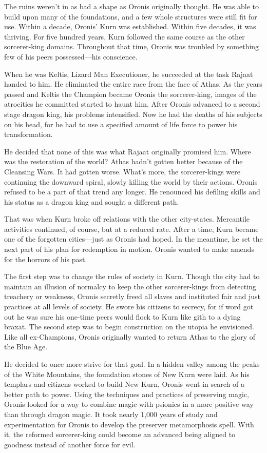 {	The ruins weren't in as bad a shape as Oronis originally thought. He was able to build upon many of the foundations, and a few whole structures were still fit for use. Within a decade, Oronis' Kurn was established. Within five decades, it was thriving. For five hundred years, Kurn followed the same course as the other sorcerer-king domains. Throughout that time, Oronis was troubled by something few of his peers possessed---his conscience.

	When he was Keltis, Lizard Man Executioner, he succeeded at the task Rajaat handed to him. He eliminated the entire race from the face of Athas. As the years passed and Keltis the Champion became Oronis the sorcerer-king, images of the atrocities he committed started to haunt him. After Oronis advanced to a second stage dragon king, his problems intensified. Now he had the deaths of his subjects on his head, for he had to use a specified amount of life force to power his transformation.

	He decided that none of this was what Rajaat originally promised him. Where was the restoration of the world? Athas hadn't gotten better because of the Cleansing Wars. It had gotten worse. What's more, the sorcerer-kings were continuing the downward spiral, slowly killing the world by their actions. Oronis refused to be a part of that trend any longer. He renounced his defiling skills and his status as a dragon king and sought a different path.

	That was when Kurn broke off relations with the other city-states. Mercantile activities continued, of course, but at a reduced rate. After a time, Kurn became one of the forgotten cities---just as Oronis had hoped. In the meantime, he set the next part of his plan for redemption in motion. Oronis wanted to make amends for the horrors of his past.

	The first step was to change the rules of society in Kurn. Though the city had to maintain an illusion of normalcy to keep the other sorcerer-kings from detecting treachery or weakness, Oronis secretly freed all slaves and instituted fair and just practices at all levels of society. He swore his citizens to secrecy, for if word got out he was sure his one-time peers would flock to Kurn like gith to a dying braxat. The second step was to begin construction on the utopia he envisioned. Like all ex-Champions, Oronis originally wanted to return Athas to the glory of the Blue Age.

	He decided to once more strive for that goal. In a hidden valley among the peaks of the White Mountains, the foundation stones of New Kurn were laid. As his templars and citizens worked to build New Kurn, Oronis went in search of a better path to power. Using the techniques and practices of preserving magic, Oronis looked for a way to combine magic with psionics in a more positive way than through dragon magic. It took nearly 1,000 years of study and experimentation for Oronis to develop the preserver metamorphosis spell. With it, the reformed sorcerer-king could become an advanced being aligned to goodness instead of another force for evil.

}
